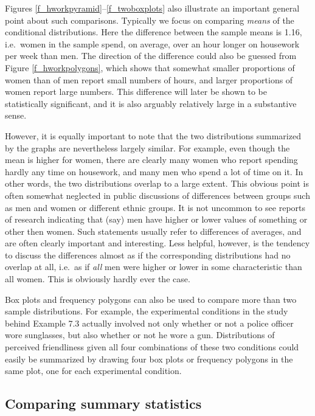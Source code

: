 Figures \ref{f_hworkpyramid}--\ref{f_twoboxplots} also illustrate an
important general point about such comparisons. Typically
we focus on
comparing \emph{means} of the conditional distributions. Here the
difference between the sample means is 1.16,
i.e.\ women in the sample spend, on average, over an
hour longer on housework per week than men. The direction of the
difference could also be guessed from Figure \ref{f_hworkpolygons},
which shows that somewhat smaller proportions of women than of men
report small numbers of hours, and larger proportions of women report
large numbers. This difference will later be shown to be statistically
significant, and it is also arguably relatively large in a substantive
sense.

However, it is equally important to note that the two
distributions summarized by the graphs are nevertheless largely
similar. For example, even though the mean is higher for women, there
are clearly many women who report spending hardly any time on housework,
and many men who spend a lot of time on it. In other words, the two
distributions overlap to a large extent. This obvious point is often
somewhat neglected in public discussions of differences between groups
such as men and women or different ethnic groups. It is not uncommon to
see reports of research indicating that (say) men have higher or lower
values of something or other then women. Such statements usually refer
to differences of averages, and are often clearly important and
interesting. Less helpful, however, is the tendency to discuss the
differences almost as if the corresponding distributions had no overlap
at all, i.e.\ as if \emph{all} men were higher or lower in some
characteristic than all women. This is obviously hardly ever the case.

Box plots and frequency polygons  can also be used to compare more than
two sample distributions. For example, the experimental conditions in
the study behind Example 7.3 actually involved not only whether or not a
police officer wore sunglasses, but also whether or not he wore a gun.
Distributions of perceived friendliness given all four
combinations of these two conditions could easily be summarized by
drawing four box plots or frequency polygons in the same plot, one for
each experimental condition.

\subsection{Comparing summary statistics}
\label{ss_means_descr_tables}

